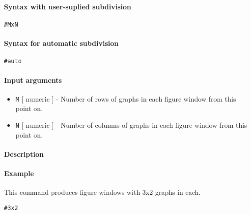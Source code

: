 


	\paragraph{Syntax with user-suplied
subdivision}\label{syntax-with-user-suplied-subdivision}

\begin{verbatim}
#MxN
\end{verbatim}

\paragraph{Syntax for automatic
subdivision}\label{syntax-for-automatic-subdivision}

\begin{verbatim}
#auto
\end{verbatim}

\paragraph{Input arguments}\label{input-arguments}

\begin{itemize}
\item
  \texttt{M} {[} numeric {]} - Number of rows of graphs in each figure
  window from this point on.
\item
  \texttt{N} {[} numeric {]} - Number of columns of graphs in each
  figure window from this point on.
\end{itemize}

\paragraph{Description}\label{description}

\paragraph{Example}\label{example}

This command produces figure windows with 3x2 graphs in each.

\begin{verbatim}
#3x2
\end{verbatim}


